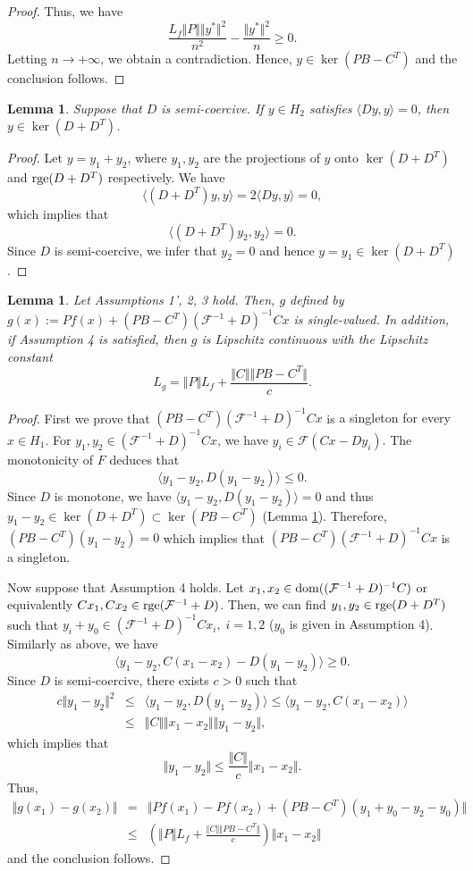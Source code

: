 \documentclass[11pt]{article}
\def\baq{\begin{eqnarray}}
\def\eaq{\end{eqnarray}}
\def\baqn{\begin{eqnarray*}}
\def\eaqn{\end{eqnarray*}}
\theoremstyle{plain}
\newtheorem{lemma}[theorem]{Lemma}
\begin{document}
{\begin{proof}
   Thus, we have 
   $$
   \frac{L_f \Vert P \Vert \Vert y^* \Vert^2 }{n^2}-\frac{ \Vert y^* \Vert^2}{n}\ge 0.
   $$
   Letting $n\to +\infty$, we obtain a contradiction. Hence,  $y\in \ker(PB-C^T)$ and the conclusion follows. 
   \end{proof}
    \begin{lemma} \label{kernel}
    Suppose that $D$ is semi-coercive. If $y\in H_2$ satisfies $\langle Dy,y \rangle=0$, then $y\in \ker(D+D^T)$.
       \end{lemma}
  \begin{proof}
  Let $y=y_1+y_2$, where $y_1, y_2$ are the projections of $y$ onto $\ker(D+D^T)$ and ${\rm rge}(D+D^T)$ respectively. We have 
  $$
  \langle (D+D^T) y, y \rangle= 2 \langle D y, y \rangle = 0,
  $$
  which implies that 
  $$
   \langle (D+D^T) y_2, y_2 \rangle=  0. 
  $$
  Since $D$ is semi-coercive, we infer that $y_2=0$ and hence $y=y_1\in \ker(D+D^T)$.
  \end{proof}      
 \begin{lemma} \label{glip}
  Let Assumptions 1', 2, 3 hold. {{Then, $g$ defined by $g(x):=Pf(x)+(PB-C^T)(\mathcal{F}^{-1}+D)^{-1}Cx$ is single-valued}}. In addition, if   Assumption 4 is satisfied, then  $g$ is Lipschitz continuous with the Lipschitz constant 
  $$
  L_g=\Vert P \Vert  L_f+\frac{\Vert C \Vert \Vert PB-C^T \Vert}{c}.
  $$
   \end{lemma}    
  \begin{proof}
First we prove that $(PB-C^T)(\mathcal{F}^{-1}+D)^{-1}Cx$ is {{a singleton for every $x\in H_1$. For}} $y_1, y_2 \in (\mathcal{F}^{-1}+D)^{-1}Cx$, we have $y_i\in \mathcal{F}(Cx-Dy_i)$. The monotonicity of $F$ deduces that 
$$\langle y_1-y_2, D(y_1-y_2) \rangle \le 0.$$
 Since $D$ is monotone, we have $\langle y_1-y_2, D(y_1-y_2) \rangle = 0$ and thus $y_1-y_2\in \ker(D+D^T)\subset \ker(PB-C^T)$ (Lemma \ref{kernel}).
 Therefore, $(PB-C^T)(y_1-y_2)=0$ which implies that $(PB-C^T)(\mathcal{F}^{-1}+D)^{-1}Cx$ is {{a singleton}}.

Now suppose that Assumption 4 holds. Let $x_1, x_2 \in {\rm dom}((\mathcal{F}^{-1}+D)^{-1}C)$ or equivalently $Cx_1, Cx_2 \in {\rm rge}({\mathcal{F}}^{-1}+D)$. Then, we can find $y_1, y_2 \in {\rm rge}(D+D^T)$ such that $y_i+y_0 \in (\mathcal{F}^{-1}+D)^{-1}Cx_i,\; i=1, 2$ {{($y_0$ is given in Assumption 4)}}. Similarly as above, we have 
$$
\langle y_1-y_2, C(x_1-x_2) -D(y_1-y_2) \rangle \ge 0.
$$
Since $D$ is semi-coercive, there exists $c>0$ such that 
\baq \nonumber
c\Vert y_1-y_2\Vert^2 &\le& \langle y_1-y_2, D(y_1-y_2) \rangle \le \langle y_1-y_2, C(x_1-x_2) \rangle \\
&\le& \Vert C \Vert \Vert x_1-x_2 \Vert \Vert y_1-y_2 \Vert, \label{semip}
\eaq
which implies that 
$$
\Vert y_1-y_2\Vert \le \frac{\Vert C \Vert}{c} \Vert x_1-x_2 \Vert .
$$
Thus,
\baqn
\Vert g(x_1)-g(x_2)\Vert &=& \Vert Pf(x_1)-Pf(x_2)+(PB-C^T) (y_1+y_0-y_2-y_0)\Vert \\
&\le & (\Vert P \Vert  L_f+\frac{\Vert C \Vert \Vert PB-C^T \Vert}{c}) \Vert x_1-x_2 \Vert
\eaqn
and the conclusion follows. 
 \end{proof}  
 
}
\end{document}
